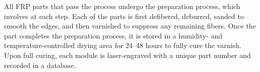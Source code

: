 




All FRP parts that pass the   process undergo the preparation process, which involves  at each step.  Each of the parts is first defibered, deburred, sanded to smooth the edges, and then varnished to
suppress any remaining fibers.  Once the part completes the preparation process, it is stored in a humidity- and temperature-controlled drying area for \numrange{24}{48} hours to fully cure the varnish.  Upon full curing, each module is laser-engraved with a unique part number and recorded in a   database. 

